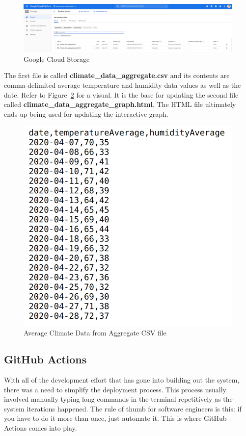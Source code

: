 \documentclass{article}
\begin{document}
\begin{figure}[H]
	\center
	\includegraphics[width=\textwidth]{images/storage.png}
	\caption{Google Cloud Storage}
	\label{fig:storage}
\end{figure}

The first file is called \textbf{climate\_data\_aggregate.csv} and its contents are comma-delimited average temperature and humidity data values as well as the date. Refer to Figure~\ref{fig:climate-data} for a visual. It is the base for updating the second file called \textbf{climate\_data\_aggregate\_graph.html}. The HTML file ultimately ends up being used for updating the interactive graph.

\begin{figure}[H]
	\center
	\includegraphics[width=.6\textwidth]{images/climate-data-csv.png}
	\caption{Average Climate Data from Aggregate CSV file}
	\label{fig:climate-data}
\end{figure}

\subsection{GitHub Actions}
With all of the development effort that has gone into building out the system, there was a need to simplify the deployment process. This process usually involved manually typing long commands in the terminal repetitively as the system iterations happened. The rule of thumb for software engineers is this: if you have to do it more than once, just automate it. This is where GitHub Actions comes into play.\\
\end{document}
